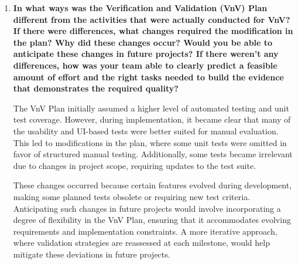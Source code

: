 \documentclass[12pt, titlepage]{article}
\begin{document}
\begin{enumerate}
  \item \textbf{In what ways was the Verification and Validation (VnV) Plan different from the activities that were actually conducted for VnV? If there were differences, what changes required the modification in the plan? Why did these changes occur? Would you be able to anticipate these changes in future projects? If there weren't any differences, how was your team able to clearly predict a feasible amount of effort and the right tasks needed to build the evidence that demonstrates the required quality?}  

  The VnV Plan initially assumed a higher level of automated testing and unit test coverage. However, during implementation, it became clear that many of the usability and UI-based tests were better suited for manual evaluation. This led to modifications in the plan, where some unit tests were omitted in favor of structured manual testing. Additionally, some tests became irrelevant due to changes in project scope, requiring updates to the test suite. 

  These changes occurred because certain features evolved during development, making some planned tests obsolete or requiring new test criteria. Anticipating such changes in future projects would involve incorporating a degree of flexibility in the VnV Plan, ensuring that it accommodates evolving requirements and implementation constraints. A more iterative approach, where validation strategies are reassessed at each milestone, would help mitigate these deviations in future projects.
  
\end{enumerate}
\end{document}
